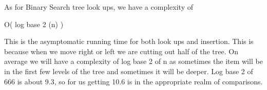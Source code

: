 \documentclass{article}
\begin{document}
As for Binary Search tree look ups, we have a complexity of 
\begin{center}
 O( log base 2 (n) )
\end{center}
This is the asymptomatic running time for both look ups and insertion. This is because when we move right or left we are cutting out half of the tree. On average we will have a complexity of log base 2 of n as sometimes the item will be in the first few levels of the tree and sometimes it will be deeper. Log base 2 of 666 is about 9.3, so for us getting 10.6 is in the appropriate realm of comparisons. 
\end{document}
